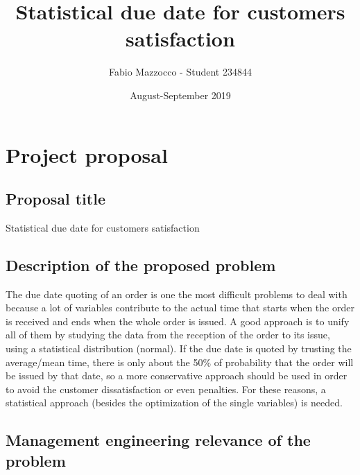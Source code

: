 \documentclass[a4paper,12pt]{article}
\begin{document}


\title{Statistical due date for customers satisfaction }
\author{Fabio Mazzocco - Student  234844}
\date{August-September 2019}
\maketitle

\section{Project proposal} 
\subsection{Proposal title}
Statistical due date for customers satisfaction

\subsection{Description of the proposed problem}

The due date quoting of an order is one the most difficult problems to deal with because a lot of variables contribute to the actual time that starts when the order is received and ends when the whole order is issued. A good approach is to unify all of them by studying the data from the reception of the order to its issue, using a statistical distribution (normal). If the due date is quoted by trusting the average/mean time, there is only about the 50\% of probability that the order will be issued by that date, so a more conservative approach should be used in order to avoid the customer dissatisfaction or even penalties. For these reasons, a statistical approach (besides the optimization of the single variables) is needed.

\subsection{Management engineering relevance of the problem}
\end{document}
